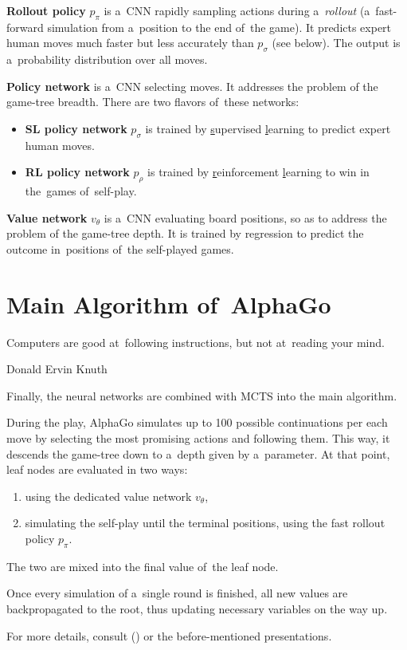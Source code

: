 \textbf{Rollout policy} $p_\pi$ is a~CNN rapidly sampling actions during a~\emph{rollout} (a~fast-forward simulation from a~position to the end of~the game).
It predicts expert human moves much faster but less accurately than $p_\sigma$ (see below).
The output is a~probability distribution over all moves.

\textbf{Policy network} is a~CNN selecting moves.
It addresses the problem of the game-tree breadth.
There are two flavors of~these networks:
\begin{itemize}
  \item \textbf{SL policy network} $p_\sigma$ is trained by \underline{s}upervised \underline{l}earning to predict expert human moves.
  \item \textbf{RL policy network} $p_\rho$ is trained by \underline{r}einforcement \underline{l}earning to win in the~games of~self-play.
\end{itemize}

\textbf{Value network} $v_\theta$ is a~CNN evaluating board positions, so as to address the problem of the game-tree depth.
It is trained by regression to predict the outcome in~positions of~the self-played games.

\section{Main Algorithm of~AlphaGo}
\epigraph{
  Computers are good at~following instructions, but not at~reading your mind.
}{Donald Ervin Knuth}
Finally, the neural networks are combined with MCTS into the main algorithm.

During the play, AlphaGo simulates up to 100 possible continuations per each move by selecting the most promising actions and following them.
This way, it descends the game-tree down to a~depth given by a~parameter.
At that point, leaf nodes are evaluated in two ways:
\begin{enumerate}[(1)]
  \item using the dedicated value network $v_\theta$,
  \item simulating the self-play until the terminal positions, using the fast rollout policy $p_\pi$.
\end{enumerate}
The two are mixed into the final value of~the leaf node.

Once every simulation of a~single round is finished, all new values are backpropagated to the root, thus updating necessary variables on the way up.

For more details, consult (\cite{Silver2016mastering}) or the before-mentioned presentations.

